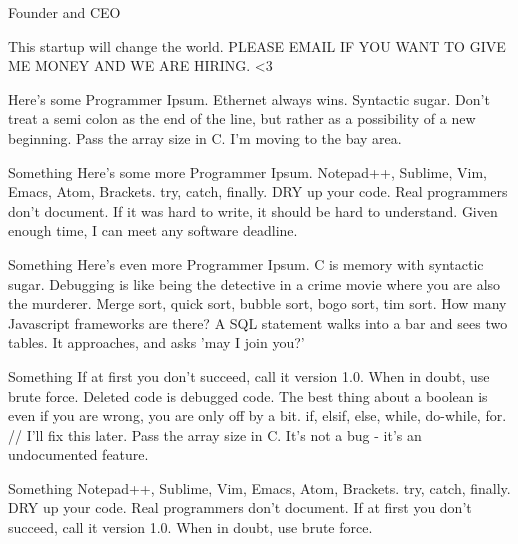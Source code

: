 \documentclass[10pt]{akshay-resume}
\begin{document}
\begin{minipage}[t]{0.6\textwidth} 




{Founder and CEO}
{\begin{tightemize}
\item This startup will change the world. PLEASE EMAIL IF YOU WANT TO GIVE ME MONEY AND WE ARE HIRING. <3
\item Here's some Programmer Ipsum. Ethernet always wins. Syntactic sugar. Don't treat a semi colon as the end of the line, but rather as a possibility of a new beginning. Pass the array size in C. I'm moving to the bay area.
\end{tightemize}
}


{Something}
{Here's some more Programmer Ipsum. Notepad++, Sublime, Vim, Emacs, Atom, Brackets. try, catch, finally. DRY up your code. Real programmers don't document. If it was hard to write, it should be hard to understand. Given enough time, I can meet any software deadline.}


{Something}
{Here's even more Programmer Ipsum. C is memory with syntactic sugar. Debugging is like being the detective in a crime movie where you are also the murderer. Merge sort, quick sort, bubble sort, bogo sort, tim sort. How many Javascript frameworks are there? A SQL statement walks into a bar and sees two tables. It approaches, and asks 'may I join you?'}


{Something}
{If at first you don't succeed, call it version 1.0. When in doubt, use brute force. Deleted code is debugged code. The best thing about a boolean is even if you are wrong, you are only off by a bit. if, elsif, else, while, do-while, for. // I'll fix this later. Pass the array size in C. It's not a bug - it's an undocumented feature.}


{Something}
{Notepad++, Sublime, Vim, Emacs, Atom, Brackets. try, catch, finally. DRY up your code. Real programmers don't document. If at first you don't succeed, call it version 1.0. When in doubt, use brute force. }


\end{minipage}
\end{document}
